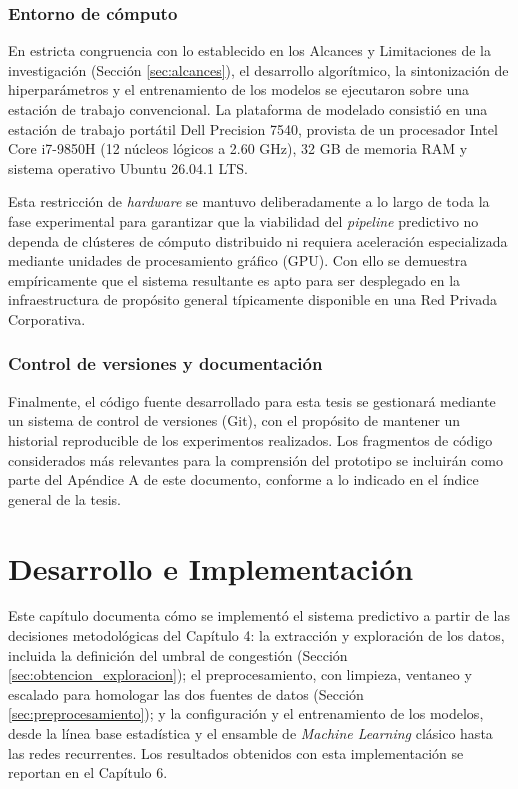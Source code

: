 \documentclass[12pt]{report}
\begin{document}
\subsection*{Entorno de cómputo}

En estricta congruencia con lo establecido en los Alcances y Limitaciones de la investigación (Sección \ref{sec:alcances}), el desarrollo algorítmico, la sintonización de hiperparámetros y el entrenamiento de los modelos se ejecutaron sobre una estación de trabajo convencional. La plataforma de modelado consistió en una estación de trabajo portátil Dell Precision 7540, provista de un procesador Intel Core i7-9850H (12 núcleos lógicos a 2.60 GHz), 32 GB de memoria RAM y sistema operativo Ubuntu 26.04.1 LTS.

Esta restricción de \textit{hardware} se mantuvo deliberadamente a lo largo de toda la fase experimental para garantizar que la viabilidad del \textit{pipeline} predictivo no dependa de clústeres de cómputo distribuido ni requiera aceleración especializada mediante unidades de procesamiento gráfico (GPU). Con ello se demuestra empíricamente que el sistema resultante es apto para ser desplegado en la infraestructura de propósito general típicamente disponible en una Red Privada Corporativa.

\subsection*{Control de versiones y documentación}

Finalmente, el código fuente desarrollado para esta tesis se gestionará mediante un sistema de control de versiones (Git), con el propósito de mantener un historial reproducible de los experimentos realizados. Los fragmentos de código considerados más relevantes para la comprensión del prototipo se incluirán como parte del Apéndice A de este documento, conforme a lo indicado en el índice general de la tesis.

\chapter{Desarrollo e Implementación}
\label{cap:desarrollo}

Este capítulo documenta cómo se implementó el sistema predictivo a partir de las decisiones metodológicas del Capítulo 4: la extracción y exploración de los datos, incluida la definición del umbral de congestión (Sección \ref{sec:obtencion_exploracion}); el preprocesamiento, con limpieza, ventaneo y escalado para homologar las dos fuentes de datos (Sección \ref{sec:preprocesamiento}); y la configuración y el entrenamiento de los modelos, desde la línea base estadística y el ensamble de \textit{Machine Learning} clásico hasta las redes recurrentes. Los resultados obtenidos con esta implementación se reportan en el Capítulo 6.
\end{document}

